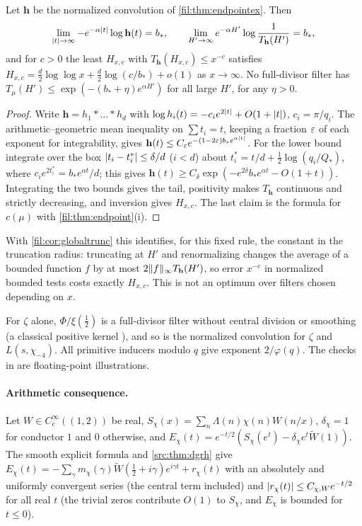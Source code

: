 \begin{proposition}\label{fil:prop:tail}
Let $\mathbf h$ be the normalized convolution of \cref{fil:thm:endpointex}. Then
\[
 \lim_{\lvert t\rvert\to\infty}-e^{-\alpha\lvert t\rvert}\log\mathbf h(t)=b_*,\qquad
 \lim_{H'\to\infty}e^{-\alpha H'}\log\frac1{T_{\mathbf h}(H')}=b_*,
\]
and for $c>0$ the least $H_{x,c}$ with $T_{\mathbf h}(H_{x,c})\le x^{-c}$ satisfies
$H_{x,c}=\frac d2\log\log x+\frac d2\log(c/b_*)+o(1)$ as $x\to\infty$. No full-divisor filter has
$T_\mu(H')\le\exp(-(b_*+\eta)e^{\alpha H'})$ for all large $H'$, for any $\eta>0$.
\end{proposition}

\begin{proof}
Write $\mathbf h=h_1*\dots*h_d$ with $\log h_i(t)=-c_ie^{2\lvert t\rvert}+O(1+\lvert t\rvert)$, $c_i=\pi/q_i$. The arithmetic--geometric
mean inequality on $\sum t_i=t$, keeping a fraction $\varepsilon$ of each exponent for integrability, gives
$\mathbf h(t)\le C_\varepsilon e^{-(1-2\varepsilon)b_*e^{\alpha\lvert t\rvert}}$. For the lower bound integrate over the box
$\lvert t_i-t_i^*\rvert\le\delta/d$ ($i<d$) about $t_i^*=t/d+\frac12\log(q_i/Q_*)$, where $c_ie^{2t_i^*}=b_*e^{\alpha t}/d$; this gives
$\mathbf h(t)\ge C_\delta\exp(-e^{2\delta}b_*e^{\alpha t}-O(1+t))$. Integrating the two bounds gives the tail, positivity
makes $T_{\mathbf h}$ continuous and strictly decreasing, and inversion gives $H_{x,c}$. The last claim is the formula
for $c(\mu)$ with \cref{fil:thm:endpoint}(i).
\end{proof}

With \cref{fil:cor:globaltrunc} this identifies, for this fixed rule, the constant in the truncation radius:
truncating at $H'$ and renormalizing changes the average of a bounded function $f$ by at most
$2\lVert f\rVert_\infty T_{\mathbf h}(H')$, so error $x^{-c}$ in normalized bounded tests costs exactly
$H_{x,c}$. This is not an optimum over filters chosen depending on $x$.

For $\zeta$ alone, $\Phi/\xi(\tfrac12)$ is a full-divisor filter without central division or smoothing (a classical
positive kernel \cite{Titchmarsh1986Theory}), and so is the normalized convolution for $\zeta$ and $L(s,\chi_{-4})$. All
primitive inducers modulo $q$ give exponent $2/\varphi(q)$. The checks in
\allowbreak{} are floating-point illustrations.

\paragraph{Arithmetic consequence.}
Let $W\in C_c^\infty((1,2))$ be real, $S_\chi(x)=\sum_n\Lambda(n)\chi(n)W(n/x)$, $\delta_\chi=1$ for conductor $1$ and
$0$ otherwise, and $E_\chi(t)=e^{-t/2}(S_\chi(e^t)-\delta_\chi e^t\widetilde W(1))$. The smooth explicit formula and
\cref{src:thm:dgrh} give $E_\chi(t)=-\sum_\gamma m_\chi(\gamma)\widetilde W(\tfrac12+i\gamma)e^{i\gamma t}+r_\chi(t)$ with an
absolutely and uniformly convergent series (the central term included) and $\lvert r_\chi(t)\rvert\le C_{\chi,W}e^{-t/2}$
for all real $t$ (the trivial zeros contribute $O(1)$ to $S_\chi$, and $E_\chi$ is bounded for $t\le0$).

